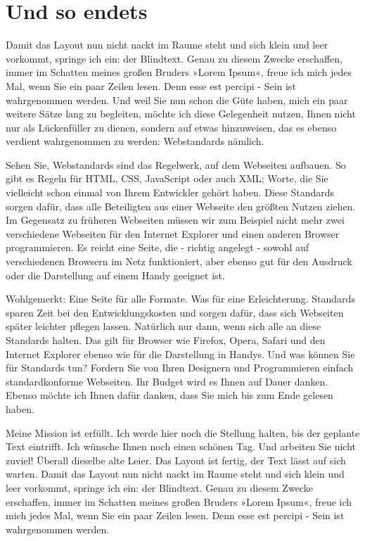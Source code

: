 \section{Und so endets}
Damit das Layout \label{oxmox} nun nicht nackt im Raume steht und sich klein und leer vorkommt, springe ich ein: der Blindtext. Genau zu diesem Zwecke erschaffen, immer im Schatten meines großen Bruders »Lorem Ipsum«, freue ich mich jedes Mal, wenn Sie ein paar Zeilen lesen. Denn esse est percipi - Sein ist wahrgenommen werden. Und weil Sie nun schon die Güte haben, mich ein paar weitere Sätze lang zu begleiten, möchte ich diese Gelegenheit nutzen, Ihnen nicht nur als Lückenfüller zu dienen, sondern auf etwas hinzuweisen, das es ebenso verdient wahrgenommen zu werden: Webstandards nämlich.

Sehen Sie, Webstandards sind das Regelwerk, auf dem Webseiten aufbauen. So gibt es Regeln für HTML, CSS, JavaScript oder auch XML; Worte, die Sie vielleicht schon einmal von Ihrem Entwickler gehört haben. Diese Standards sorgen dafür, dass alle Beteiligten aus einer Webseite den größten Nutzen ziehen. Im Gegensatz zu früheren Webseiten müssen wir zum Beispiel nicht mehr zwei verschiedene Webseiten für den Internet Explorer und einen anderen Browser programmieren. Es reicht eine Seite, die - richtig angelegt - sowohl auf verschiedenen Browsern im Netz funktioniert, aber ebenso gut für den Ausdruck oder die Darstellung auf einem Handy geeignet ist.

Wohlgemerkt: Eine Seite für alle Formate. Was für eine Erleichterung. Standards sparen Zeit bei den Entwicklungskosten und sorgen dafür, dass sich Webseiten später leichter pflegen lassen. Natürlich nur dann, wenn sich alle an diese Standards halten. Das gilt für Browser wie Firefox, Opera, Safari und den Internet Explorer ebenso wie für die Darstellung in Handys. Und was können Sie für Standards tun? Fordern Sie von Ihren Designern und Programmieren einfach standardkonforme Webseiten. Ihr Budget wird es Ihnen auf Dauer danken. Ebenso möchte ich Ihnen dafür danken, dass Sie mich bis zum Ende gelesen haben.

Meine Mission ist erfüllt. Ich werde hier noch die Stellung halten, bis der geplante Text eintrifft. Ich wünsche Ihnen noch einen schönen Tag. Und arbeiten Sie nicht zuviel! Überall dieselbe alte Leier. Das Layout ist fertig, der Text lässt auf sich warten. Damit das Layout nun nicht nackt im Raume steht und sich klein und leer vorkommt, springe ich ein: der Blindtext. Genau zu diesem Zwecke erschaffen, immer im Schatten meines großen Bruders »Lorem Ipsum«, freue ich mich jedes Mal, wenn Sie ein paar Zeilen lesen. Denn esse est percipi - Sein ist wahrgenommen werden.

